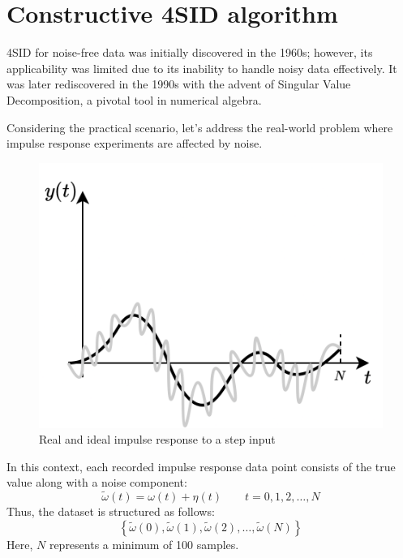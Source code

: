 \section{Constructive 4SID algorithm}

4SID for noise-free data was initially discovered in the 1960s; however, its applicability was limited due to its inability to handle noisy data effectively. 
It was later rediscovered in the 1990s with the advent of Singular Value Decomposition, a pivotal tool in numerical algebra.

Considering the practical scenario, let's address the real-world problem where impulse response experiments are affected by noise.
\begin{figure}[H]
    \centering
    \includegraphics[width=0.5\linewidth]{images/noiserep.png}
    \caption{Real and ideal impulse response to a step input}
\end{figure}
In this context, each recorded impulse response data point consists of the true value along with a noise component:
\[\tilde{\omega}(t)=\omega(t)+\eta(t)\qquad t=0,1,2,\dots,N\]
Thus, the dataset is structured as follows:
\[\left\{ \tilde{\omega}(0),\tilde{\omega}(1),\tilde{\omega}(2),\dots,\tilde{\omega}(N)\right\}\]
Here, $N$ represents a minimum of 100 samples. 

